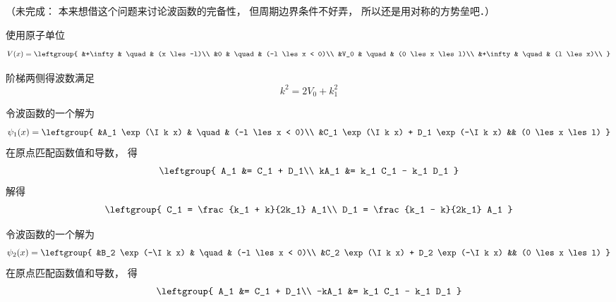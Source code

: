 
（未完成： 本来想借这个问题来讨论波函数的完备性， 但周期边界条件不好弄， 所以还是用对称的方势垒吧．）

使用原子单位
\begin{equation}
V(x) = \leftgroup{
&+\infty & \quad & (x \les -l)\\
&0 & \quad & (-l \les x < 0)\\
&V_0 & \quad & (0 \les x \les l)\\
&+\infty & \quad & (l \les x)\\
}
\end{equation}

阶梯两侧得波数满足
\begin{equation}
k^2 = 2V_0 + k_1^2
\end{equation}

令波函数的一个解为
\begin{equation}
\psi_1(x) = \leftgroup{
&A_1 \exp(\I k x) & \quad & (-l \les x < 0)\\
&C_1 \exp(\I k x) + D_1 \exp(-\I k x) && (0 \les x \les l)
}
\end{equation}
在原点匹配函数值和导数， 得
\begin{equation}
\leftgroup{
    A_1 &= C_1 + D_1\\
    kA_1 &= k_1 C_1 - k_1 D_1
}
\end{equation}
解得
\begin{equation}
\leftgroup{
    C_1 = \frac{k_1 + k}{2k_1} A_1\\
    D_1 = \frac{k_1 - k}{2k_1} A_1
}
\end{equation}

令波函数的一个解为
\begin{equation}
\psi_2(x) = \leftgroup{
&B_2 \exp(-\I k x) & \quad & (-l \les x < 0)\\
&C_2 \exp(\I k x) + D_2 \exp(-\I k x) && (0 \les x \les l)
}
\end{equation}
在原点匹配函数值和导数， 得
\begin{equation}
\leftgroup{
    A_1 &= C_1 + D_1\\
    -kA_1 &= k_1 C_1 - k_1 D_1
}
\end{equation}



